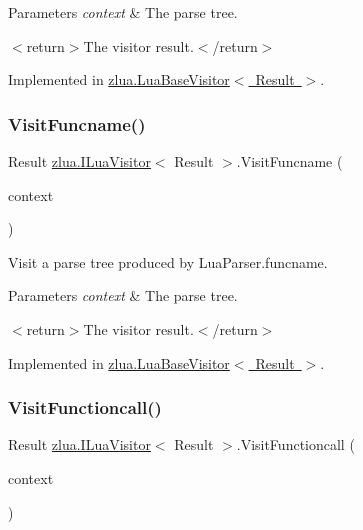\begin{DoxyParams}{Parameters}
{\em context} & The parse tree.\\
\hline
\end{DoxyParams}
$<$return$>$The visitor result.$<$/return$>$ 

Implemented in \mbox{\hyperlink{classzlua_1_1_lua_base_visitor_a489f2fe8dfd967614367a84330275c33}{zlua.\+Lua\+Base\+Visitor$<$ Result $>$}}.

\mbox{\label{interfacezlua_1_1_i_lua_visitor_a125d3084a4d08cdfcea09f917afdf222}} 
\subsubsection{\texorpdfstring{Visit\+Funcname()}{VisitFuncname()}}
{\footnotesize\ttfamily Result \mbox{\hyperlink{interfacezlua_1_1_i_lua_visitor}{zlua.\+I\+Lua\+Visitor}}$<$ Result $>$.Visit\+Funcname (\begin{DoxyParamCaption}\item[{\mbox{[}\+Not\+Null\mbox{]} \mbox{\hyperlink{classzlua_1_1_lua_parser_1_1_funcname_context}{Lua\+Parser.\+Funcname\+Context}}}]{context }\end{DoxyParamCaption})}



Visit a parse tree produced by Lua\+Parser.\+funcname. 


\begin{DoxyParams}{Parameters}
{\em context} & The parse tree.\\
\hline
\end{DoxyParams}
$<$return$>$The visitor result.$<$/return$>$ 

Implemented in \mbox{\hyperlink{classzlua_1_1_lua_base_visitor_a07e2a1501c3a324becaaa42633bb7dbf}{zlua.\+Lua\+Base\+Visitor$<$ Result $>$}}.

\mbox{\label{interfacezlua_1_1_i_lua_visitor_ac5b248028640e893638d96fee0463367}} 
\subsubsection{\texorpdfstring{Visit\+Functioncall()}{VisitFunctioncall()}}
{\footnotesize\ttfamily Result \mbox{\hyperlink{interfacezlua_1_1_i_lua_visitor}{zlua.\+I\+Lua\+Visitor}}$<$ Result $>$.Visit\+Functioncall (\begin{DoxyParamCaption}\item[{\mbox{[}\+Not\+Null\mbox{]} \mbox{\hyperlink{classzlua_1_1_lua_parser_1_1_functioncall_context}{Lua\+Parser.\+Functioncall\+Context}}}]{context }\end{DoxyParamCaption})}



